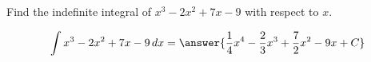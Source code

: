 \documentclass{ximera}
\author{Gregory Hartman \and Matthew Carr}
\begin{document}
\begin{exercise}

Find the indefinite integral of $x^3-2x^2+7x-9$ with respect to $x$.
\begin{prompt}
  \[
  \int x^3-2x^2+7x-9\d x =\answer{\frac{1}{4}x^4-\frac{2}{3}x^3+\frac{7}{2}x^2-9x+C}
  \]
\end{prompt}

\end{exercise}
\end{document}
